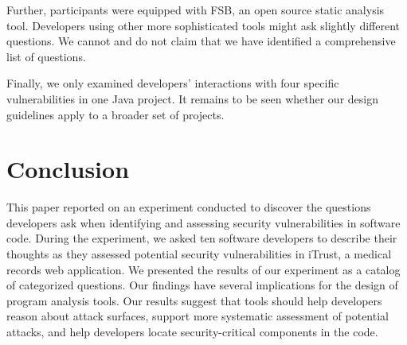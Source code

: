 \documentclass[conference]{IEEEtran}
\newcommand{\blind}[1]{{\color{white}\{#1\}}}
\begin{document}
Further, participants were equipped with FSB, an open source static analysis tool. 
Developers using other more sophisticated tools might ask slightly different questions.
We cannot and do not claim that we have identified a comprehensive list of questions.

Finally, we only examined developers' interactions with four specific vulnerabilities in one Java project. 
It remains to be seen whether our design guidelines apply to a broader set of projects.




\section{Conclusion}
\label{sec:concl}
This paper reported on an experiment conducted to discover the questions developers ask when identifying and assessing security vulnerabilities in software code.
During the experiment, we asked ten software developers to describe their thoughts as they assessed potential security vulnerabilities in iTrust, a medical records web application.
We presented the results of our experiment as a catalog of categorized questions.
Our findings have several implications for the design of program analysis tools. Our results suggest that tools should help developers reason about attack surfaces, support more systematic assessment of potential attacks, and help developers locate security-critical components in the code.










%



\end{document}
